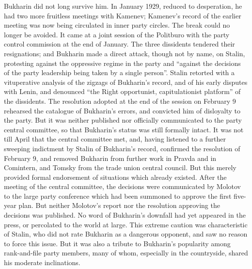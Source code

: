 Bukharin did not long survive him. In January 1929, reduced to desperation, he had two more fruitless meetings with Kamenev; Kamenev's record of the earlier meeting was now being circulated in inner party circles. The break could no longer be avoided. It came at a joint session of the Politburo with the party control commission at the end of January. The three dissidents tendered their resignations; and Bukharin made a direct attack, though not by name, on Stalin, protesting against the oppressive regime in the party and ``against the decisions of the party leadership being taken by a single person''. Stalin retorted with a vituperative analysis of the zigzags of Bukharin's record, and of his early disputes with Lenin, and denounced ``the Right opportunist, capitulationist platform'' of the dissidents. The resolution adopted at the end of the session on February 9 rehearsed the catalogue of Bukharin's errors, and convicted him of disloyalty to the party. But it was neither published nor officially communicated to the party central committee, so that Bukharin's status was still formally intact. It was not till April that the central committee met, and, having listened to a further sweeping indictment by Stalin of Bukharin's record, confirmed the resolution of February 9, and removed Bukharin from further work in Pravda and in Comintern, and Tomsky from the trade union central council. But this merely provided formal endorsement of situations which already existed. After the meeting of the central committee, the decisions were communicated by Molotov to the large party conference which had been summoned to approve the first five-year plan. But neither Molotov's report nor the resolution approving the decisions was published. No word of Bukharin's downfall had yet appeared in the press, or percolated to the world at large. This extreme caution was characteristic of Stalin, who did not rate Bukharin as a dangerous opponent, and saw no reason to force this issue. But it was also a tribute to Bukharin's popularity among rank-and-file party members, many of whom, especially in the countryside, shared his moderate inclinations. 

